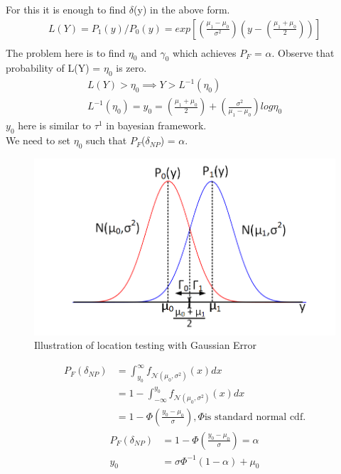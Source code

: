 \documentclass[12pt]{report}
\begin{document}
For this it is enough to find $ \delta $(y) in the above form. 
\begin{align*}
L(Y) = P_1(y)/P_0(y) = exp[({\frac{\mu_1-\mu_0}{\sigma^2 }})(y-(\frac{\mu_1+\mu_0}{2}))]\\[-10pt]
\end{align*}
The problem here is to find $\eta_0$ and $\gamma_0$ which achieves $P_F$ = $\alpha$.
Observe that probability of L(Y) = $\eta_0$ is zero.\\[-200pt]
\begin{align*}
L(Y) > \eta_0 \implies Y > L^{-1}(\eta_0)\\
 L^{-1}(\eta_0) = y_0 = (\frac{\mu_1+\mu_0}{2}) +( \frac{\sigma^2 }{\mu_1-\mu_0})log\eta_0
\end{align*}
$y_0$ here is similar to $\tau^1$ in bayesian framework.\\
We need to set $\eta_0$ such that $P_F$($\delta_{NP}$) = $\alpha$.\\
\begin{figure}[h]
\centering
\includegraphics[scale=0.5]{Figures/Gaussian}
\caption{Illustration of location testing with Gaussian Error}
\label{fig:Gaussian}
\end{figure}
\begin{align*}
P_F(\delta_{NP}) &= \int_{y_0}^{\infty} f_{\mathcal{N}(\mu_0,\sigma^2)}(x) dx\\
&=1 - \int_{-\infty}^{y_0} f_{\mathcal{N}(\mu_0,\sigma^2)}(x) dx\\
&=1- \Phi(\frac{y_0-\mu_0}{\sigma}) ,\Phi \text{is standard normal cdf.}
\end{align*}
\begin{align*}
P_F(\delta_{NP}) &=
1 - \Phi(\frac{y_0-\mu_0}{\sigma}) = \alpha\\
 y_0 & = \sigma\Phi^{-1}(1-\alpha)+\mu_0
\end{align*}
\end{document}
